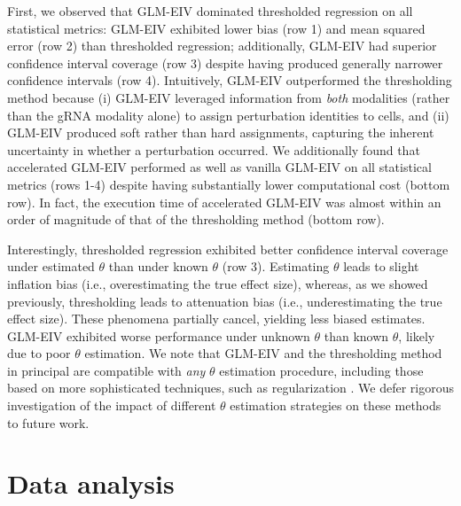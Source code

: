 \documentclass[12pt]{article}
\begin{document}
First, we observed that GLM-EIV dominated thresholded regression on all statistical metrics: GLM-EIV exhibited lower bias (row 1) and mean squared error (row 2) than thresholded regression; additionally, GLM-EIV had superior confidence interval coverage (row 3) despite having produced generally narrower confidence intervals (row 4). Intuitively, GLM-EIV outperformed the thresholding method because (i) GLM-EIV leveraged information from \textit{both} modalities (rather than the gRNA modality alone) to assign perturbation identities to cells, and (ii) GLM-EIV produced soft rather than hard assignments, capturing the inherent uncertainty in whether a perturbation occurred. We additionally found that accelerated GLM-EIV performed as well as vanilla GLM-EIV on all statistical metrics (rows 1-4) despite having substantially lower computational cost (bottom row). In fact, the execution time of accelerated GLM-EIV was almost within an order of magnitude of that of the thresholding method (bottom row).

Interestingly, thresholded regression exhibited better confidence interval coverage under estimated $\theta$ than under known $\theta$ (row 3). Estimating $\theta$ leads to slight inflation bias (i.e., overestimating the true effect size), whereas, as we showed previously, thresholding leads to attenuation bias (i.e., underestimating the true effect size). These phenomena partially cancel, yielding less biased estimates. GLM-EIV exhibited worse performance under unknown $\theta$ than known $\theta$, likely due to poor $\theta$ estimation. We note that GLM-EIV and the thresholding method in principal are compatible with \textit{any} $\theta$ estimation procedure, including those based on more sophisticated techniques, such as regularization \cite{Hafemeister2019}. We defer rigorous investigation of the impact of different $\theta$ estimation strategies on these methods to future work.

\section{Data analysis}
\end{document}
